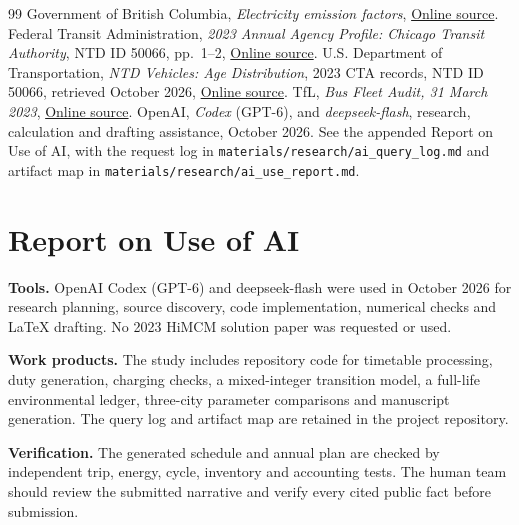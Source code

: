 \documentclass[12pt,letterpaper]{article}
\begin{document}
\begin{thebibliography}{99}
 Government of British Columbia, \emph{Electricity emission factors}, \href{https://www2.gov.bc.ca/gov/content/environment/climate-change/data/electricity}{Online source}.
 Federal Transit Administration, \emph{2023 Annual Agency Profile: Chicago Transit Authority}, NTD ID 50066, pp.~1--2, \href{https://www.transit.dot.gov/sites/fta.dot.gov/files/transit_agency_profile_doc/2023/50066.pdf}{Online source}.
 U.S. Department of Transportation, \emph{NTD Vehicles: Age Distribution}, 2023 CTA records, NTD ID 50066, retrieved October 2026, \href{https://data.transportation.gov/d/6abt-uhgq}{Online source}.
 TfL, \emph{Bus Fleet Audit, 31 March 2023}, \href{https://content.tfl.gov.uk/fleet-annual-audit-report-31-march-2023.pdf}{Online source}.
 OpenAI, \emph{Codex} (GPT-6), and \emph{deepseek-flash}, research, calculation and drafting assistance, October 2026. See the appended Report on Use of AI, with the request log in \nolinkurl{materials/research/ai_query_log.md} and artifact map in \nolinkurl{materials/research/ai_use_report.md}.
\end{thebibliography}

\newpage
\section*{Report on Use of AI}
\textbf{Tools.} OpenAI Codex (GPT-6) and deepseek-flash were used in October 2026 for research planning, source discovery, code implementation, numerical checks and LaTeX drafting. No 2023 HiMCM solution paper was requested or used.\cite{aicodex}

\textbf{Work products.} The study includes repository code for timetable processing, duty generation, charging checks, a mixed-integer transition model, a full-life environmental ledger, three-city parameter comparisons and manuscript generation. The query log and artifact map are retained in the project repository.

\textbf{Verification.} The generated schedule and annual plan are checked by independent trip, energy, cycle, inventory and accounting tests. The human team should review the submitted narrative and verify every cited public fact before submission.
\end{document}
